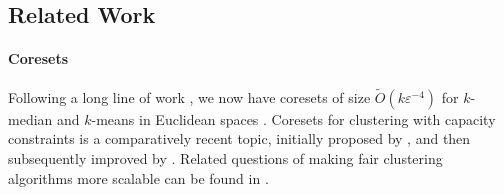 

\subsection{Related Work}
\paragraph{Coresets} Following a long line of work \cite{BachemL018,BecchettiBC0S19,BravermanJKW21,Chen09,stoc,FL11,FeldmanSS20,
FengKW21,FGSSS13,HaK07, HaM04, huang2020coresets, LS10, SohlerW18}, we now have coresets of size $\tilde{O}(k\varepsilon^{-4})$ for $k$-median and $k$-means in Euclidean spaces \cite{stoc}.
Coresets for clustering with capacity constraints is a comparatively recent topic, initially proposed by \cite{SSS19}, and then subsequently improved by \cite{BandyapadhyayFS21,HuangJV19}. Related questions of making fair clustering algorithms more scalable can be found in \cite{BIOSVW19}.
